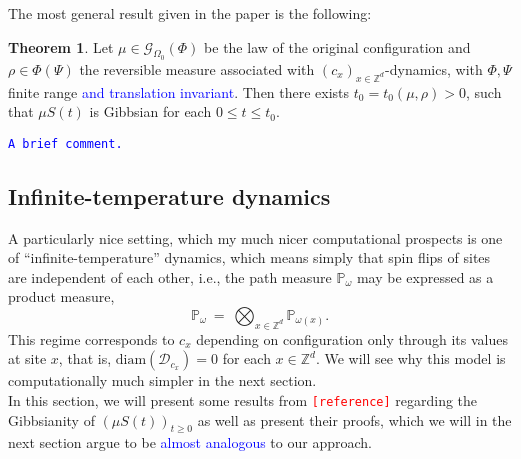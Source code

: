 \documentclass[12pt]{article}
\newcommand{\D}{\mathcal{D}}
\newcommand{\G}{\mathcal{G}}
\renewcommand{\P}{\mathbb{P}}
\newcommand{\Z}{\mathbb{Z}}
\newcommand{\1}{\mathbbm{1}}
\newcommand{\5}{\vspace{0.5cm}}
\theoremstyle{definition}
\newtheorem{thm}{Theorem}[section]
\begin{document}
The most general result given in the paper is the following:

\begin{thm}
Let $\mu\in\G_{\Omega_0}(\Phi)$ be the law of the original configuration and $\rho\in\Phi(\Psi)$ the reversible measure associated with $(c_x)_{x\in\Z^d}$-dynamics, with $\Phi,\Psi$ finite range \textcolor{blue}{and translation invariant}. Then there exists $t_0=t_0(\mu,\rho)>0$, such that $\mu S(t)$ is Gibbsian for each $0\leq t\leq t_0$. 
\end{thm}

\textcolor{blue}{\texttt{A brief comment.}}
 

\subsection{Infinite-temperature dynamics}

A particularly nice setting, which my much nicer computational prospects is one of ``infinite-temperature'' dynamics, which means simply that spin flips of sites are independent of each other, i.e., the path measure $\P_\omega$ may be expressed as a product measure,
$$\P_\omega ~=~ \bigotimes_{x\in\Z^d}\P_{\omega(x)}.$$
This regime corresponds to $c_x$ depending on configuration only through its values at site $x$, that is, $\mathrm{diam}(\D_{c_x})=0$ for each $x\in\Z^d$. We will see why this model is computationally much simpler in the next section. \\

In this section, we will present some results from \textcolor{red}{\texttt{[reference]}} regarding the Gibbsianity of $(\mu S(t))_{t\geq 0}$ as well as present their proofs, which we will in the next section argue to be \textcolor{blue}{almost analogous} to our approach. \\
\end{document}
